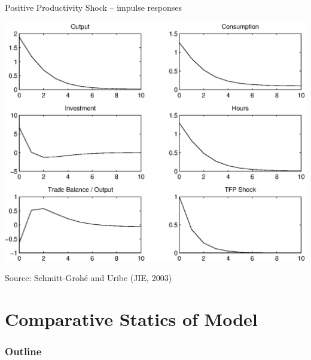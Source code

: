 \documentclass{beamer}
\begin{document}
\begin{frame}{Positive Productivity Shock -- impulse responses} 



\centering
\includegraphics[width = 0.85\linewidth]{FIGURES/soe_rbc_edeir.eps} 

{\tiny Source: Schmitt-Groh\'e and Uribe (JIE, 2003)}

\end{frame}

\section{Comparative Statics of Model}

\begin{frame}
\frametitle{Outline}
\tableofcontents[currentsection]
\end{frame}
\end{document}

